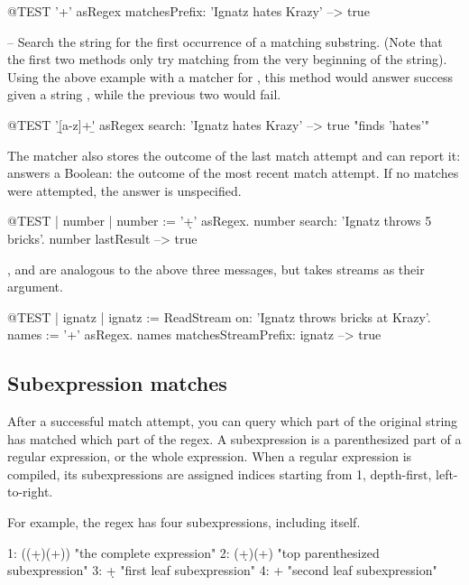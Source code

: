 \documentclass[a4paper,10pt,twoside]{book}
\begin{document}
{\begin{code}{@TEST}
'\w+' asRegex matchesPrefix: 'Ignatz hates Krazy' --> true
\end{code}

 -- Search the string for the first occurrence of a matching substring. (Note that the first two methods only try matching from  the very beginning of the string). Using the above example with a  matcher for , this method would answer success given a string , while the previous two would fail.

\begin{code}{@TEST}
'\b[a-z]+\b' asRegex search: 'Ignatz hates Krazy' --> true    "finds 'hates'"
\end{code}


The matcher also stores the outcome of the last match attempt and can report it:  answers a Boolean: the outcome of the most recent match attempt. If no matches were attempted, the answer is unspecified.

\begin{code}{@TEST | number |}
number := '\d+' asRegex.
number search: 'Ignatz throws 5 bricks'.
number lastResult --> true
\end{code}

,  and  are analogous to the above three messages, but takes streams as their argument.

\begin{code}{@TEST | ignatz |}
ignatz := ReadStream on: 'Ignatz throws bricks at Krazy'.
names := '\<[A-Z][a-z]+\>' asRegex.
names matchesStreamPrefix: ignatz --> true
\end{code}

\subsection{Subexpression matches}

After a successful match attempt, you can query which part of the original string has matched which part of the regex. A subexpression is a parenthesized part of a regular expression, or the whole expression. When a regular expression is compiled, its subexpressions are assigned indices starting from 1, depth-first, left-to-right.

For example, the regex \ct{((\d+)\s*(\w+))} has four subexpressions, including itself.
\begin{code}{}
1:    ((\d+)\s*(\w+))    "the complete expression"
2:    (\d+)\s*(\w+)       "top parenthesized subexpression"
3:    \d+                      "first leaf subexpression"
4:    \w+                     "second leaf subexpression"
\end{code}

}
\end{document}

